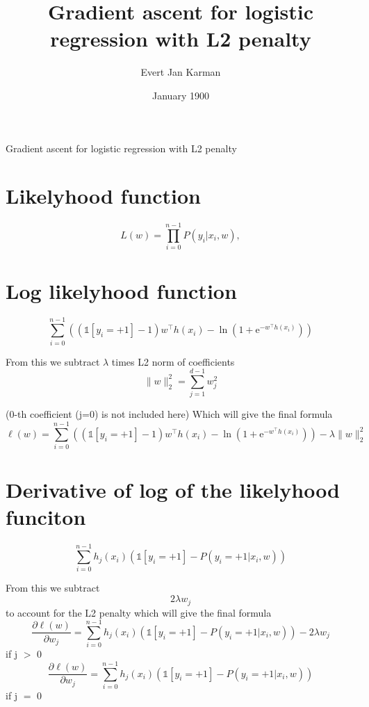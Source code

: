 \documentclass[12pt, letterpaper]{article}
\title{Gradient ascent for logistic regression with L2 penalty}
\author{Evert Jan Karman}
\date{January 1900}
\begin{document}
\maketitle

Gradient ascent for logistic regression with L2 penalty

\section{Likelyhood function}

\[
L(w)
= \prod_{i=0}^{n-1} P(y_i | x_i, w),
\]

\section{Log likelyhood function}
\[
\sum_{i=0}^{n-1} ( ( \mathds{1}[y_i=+1] - 1) w^\top h(x_i) - \ln ( 1 + \mathrm{e}^{-w^\top h(x_i)} ) )
\]

From this we subtract \(\lambda\) times L2 norm of coefficients
\[
\lVert w \rVert_2^2
=
\sum_{j=1}^{d-1} w_j^2
\]

(0-th coefficient (j=0) is not included here)
Which will give the final formula
\[
\ell(w)
= \sum_{i=0}^{n-1} ( ( \mathds{1}[y_i=+1] - 1) w^\top h(x_i) - \ln ( 1 + \mathrm{e}^{-w^\top h(x_i)} ) ) - \lambda \lVert w \rVert_2^2
\]


\section{Derivative of log of the likelyhood funciton}

\[
\sum_{i=0}^{n-1} h_j(x_i) ( \mathds{1}[y_i=+1] - P(y_i=+1 | x_i,w))
\]

From this we subtract
\[
2 \lambda w_{j}
\]
to account for the L2 penalty which will give the final formula
\[
\frac{\partial \ell(w)}{\partial w_j} = \sum_{i=0}^{n-1} h_j(x_i) ( \mathds{1}[y_i=+1] - P(y_i=+1 | x_i,w)) - 2 \lambda w_{j}
\]
if j \(>\) 0
\[
\frac{\partial \ell(w)}{\partial w_j} = \sum_{i=0}^{n-1} h_j(x_i) ( \mathds{1}[y_i=+1] - P(y_i=+1 | x_i,w))
\]
if j \(=\) 0
\end{document}
